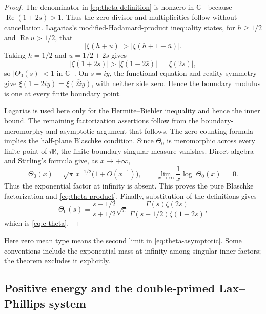 \documentclass[11pt]{amsart}
\theoremstyle{definition}
\theoremstyle{remark}
\DeclareMathOperator{\Repart}{Re}
\newcommand{\C}{\mathbb C}
\newcommand{\R}{\mathbb R}
\newcommand{\abs}[1]{\left\lvert #1\right\rvert}
\begin{document}
\begin{proof}
The denominator in \eqref{eq:theta-definition} is nonzero in $\C_+$ because
$\Repart(1+2s)>1$.  Thus the zero divisor and multiplicities follow without
cancellation.  Lagarias's modified-Hadamard-product inequality
\cite[Lemma~2.1]{Lagarias2005} states, for $h\geq1/2$ and
$\Repart u>1/2$, that
\[
 \abs{\xi(h+u)}>\abs{\xi(h+1-\bar u)}.
\]
Taking $h=1/2$ and $u=1/2+2s$ gives
\[
 \abs{\xi(1+2s)}>\abs{\xi(1-2\bar s)}
 =\abs{\xi(2s)},
\]
so $\abs{\Theta_0(s)}<1$ in $\C_+$.  On $s=iy$, the functional equation
and reality symmetry give
$\xi(1+2iy)=\overline{\xi(2iy)}$, with neither side zero.  Hence the boundary
modulus is one at every finite boundary point.

Lagarias is used here only for the Hermite--Biehler inequality and hence the
inner bound.  The remaining factorization assertions follow from the
boundary-meromorphy and asymptotic argument that follows.  The zero counting
formula implies the half-plane Blaschke condition.  Since
$\Theta_0$ is meromorphic across every finite point of $i\R$, the finite
boundary singular measure vanishes.  Direct algebra and Stirling's formula
give, as $x\to+\infty$,
\begin{equation}\label{eq:theta-asymptotic}
 \Theta_0(x)=\sqrt\pi\,x^{-1/2}\bigl(1+O(x^{-1})\bigr),
 \qquad
 \lim_{x\to\infty}\frac1x\log\abs{\Theta_0(x)}=0.
\end{equation}
Thus the exponential factor at infinity is absent.  This proves the pure
Blaschke factorization and \eqref{eq:theta-product}.  Finally, substitution
of the definitions gives
\[
 \Theta_0(s)=
 \frac{s-1/2}{s+1/2}\sqrt\pi\,
 \frac{\Gamma(s)\zeta(2s)}{\Gamma(s+1/2)\zeta(1+2s)},
\]
which is \eqref{eq:c-theta}.
\end{proof}

Here zero mean type means the second limit in
\eqref{eq:theta-asymptotic}.  Some conventions include the exponential mass
at infinity among singular inner factors; the theorem excludes it explicitly.

\subsection{Positive energy and the double-primed Lax--Phillips system}
\end{document}
